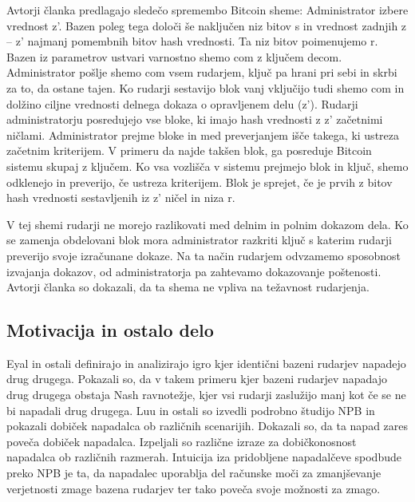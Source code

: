 \documentclass{acm_proc_article-sp}
\begin{document}
Avtorji članka predlagajo sledečo spremembo Bitcoin sheme:
Administrator izbere vrednost z'. Bazen poleg tega določi še naključen niz bitov s in vrednost zadnjih z – z' najmanj pomembnih bitov hash vrednosti. Ta niz bitov poimenujemo r.
Bazen iz parametrov ustvari varnostno shemo com z ključem decom. Administrator pošlje shemo com vsem rudarjem, ključ pa hrani pri sebi in skrbi za to, da ostane tajen. Ko rudarji sestavijo blok vanj vključijo tudi shemo com in dolžino ciljne vrednosti delnega dokaza o opravljenem delu (z'). Rudarji administratorju posredujejo vse bloke, ki imajo hash vrednosti z z' začetnimi ničlami. Administrator prejme bloke in med preverjanjem išče takega, ki ustreza začetnim kriterijem. V primeru da najde takšen blok, ga posreduje Bitcoin sistemu skupaj z ključem. Ko vsa vozlišča v sistemu prejmejo blok in ključ, shemo odklenejo in preverijo, če ustreza kriterijem. Blok je sprejet, če je prvih z bitov hash vrednosti sestavljenih iz z' ničel in niza r.
 
V tej shemi rudarji ne morejo razlikovati med delnim in polnim dokazom dela. Ko se zamenja obdelovani blok mora administrator razkriti ključ s katerim rudarji preverijo svoje izračunane dokaze. Na ta način rudarjem odvzamemo sposobnost izvajanja dokazov, od administratorja pa zahtevamo dokazovanje poštenosti. Avtorji članka so dokazali, da ta shema ne vpliva na težavnost rudarjenja.



\subsection{Motivacija in ostalo delo}\label{sekcija1a}

Eyal \cite{minnersdilemma} in ostali definirajo in analizirajo igro kjer identični bazeni rudarjev napadejo drug drugega. Pokazali so, da v takem primeru kjer bazeni rudarjev napadajo drug drugega obstaja Nash ravnotežje, kjer vsi rudarji zaslužijo manj kot če se ne bi napadali drug drugega. Luu in ostali \cite{powersplitting} so izvedli podrobno študijo NPB in pokazali dobiček napadalca ob različnih scenarijih. Dokazali so, da ta napad zares poveča dobiček napadalca. Izpeljali so različne izraze za dobičkonosnost napadalca ob različnih razmerah. Intuicija iza pridobljene napadalčeve spodbude preko NPB je ta, da napadalec uporablja del računske moči za zmanjševanje verjetnosti zmage bazena rudarjev ter tako poveča svoje možnosti za zmago.
\end{document}

